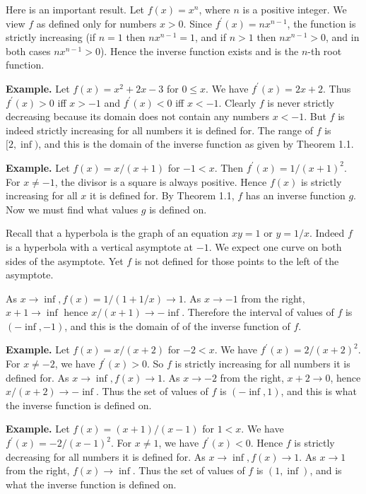 Here is an important result. Let $f(x) = x^n$, where $n$ is a positive integer. We view $f$ as defined only for numbers $x > 0$. Since $f^\prime(x) = nx^{n-1}$, the function is strictly increasing (if $n = 1$ then $nx^{n-1} = 1$, and if $n > 1$ then $nx^{n-1} > 0$, and in both cases $nx^{n-1} > 0$). Hence the inverse function exists and is the $n$-th root function.

\textbf{Example.} Let $f(x) = x^2 + 2x - 3$ for $0 \le x$. We have $f^\prime(x) = 2x + 2$. Thus $f^\prime(x) > 0$ iff $x > -1$ and $f^\prime(x) < 0$ iff $x < -1$. Clearly $f$ is never strictly decreasing because its domain does not contain any numbers $x < -1$. But $f$ is indeed strictly increasing for all numbers it is defined for. The range of $f$ is $[2, \inf)$, and this is the domain of the inverse function as given by Theorem 1.1. 

  \textbf{Example.} Let $f(x) = x/(x+1)$ for $-1 < x$. Then $f^\prime(x) = 1/(x+1)^2$. For $x \ne -1$, the divisor is a square is always positive. Hence $f(x)$ is strictly increasing for all $x$ it is defined for. By Theorem 1.1, $f$ has an inverse function $g$. Now we must find what values $g$ is defined on.
  
  Recall that a hyperbola is the graph of an equation $xy = 1$ or $y = 1/x$. Indeed $f$ is a hyperbola with a vertical asymptote at $-1$. We expect one curve on both sides of the asymptote. Yet $f$ is not defined for those points to the left of the asymptote.
  
  As $x \to \inf, f(x) = 1/(1 + 1/x) \to 1$. As $x \to -1$ from the right, $x + 1 \to \inf$ hence $x/(x + 1) \to -\inf$. Therefore the interval of values of $f$ is $(-\inf, -1)$, and this is the domain of of the inverse function of $f$.

  \textbf{Example.} Let $f(x) = x/(x + 2)$ for $-2 < x$. We have $f^\prime(x) = 2/(x + 2)^2$. For $x \ne -2$, we have $f^\prime(x) > 0$. So $f$ is strictly increasing for all numbers it is defined for. As $x \to \inf, f(x) \to 1$. As $x \to -2$ from the right, $x + 2 \to 0$, hence $x/(x + 2) \to -\inf$. Thus the set of values of $f$ is $(-\inf, 1)$, and this is what the inverse function is defined on.

  \textbf{Example.} Let $f(x) = (x + 1)/(x - 1)$ for $1 < x$. We have $f^\prime(x) = -2/(x - 1)^2$. For $x \ne 1$, we have $f^\prime(x) < 0$. Hence $f$ is strictly decreasing for all numbers it is defined for. As $x \to \inf, f(x) \to 1$. As $x \to 1$ from the right, $f(x) \to \inf$. Thus the set of values of $f$ is $(1, \inf)$, and is what the inverse function is defined on.

